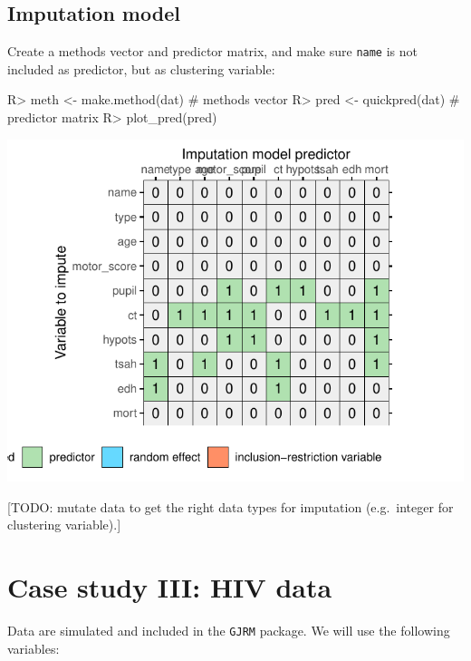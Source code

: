\documentclass[
]{jss}
\begin{document}
\hypertarget{imputation-model}{%
\subsection{Imputation model}\label{imputation-model}}

Create a methods vector and predictor matrix, and make sure
\texttt{name} is not included as predictor, but as clustering variable:

\begin{CodeChunk}
\begin{CodeInput}
R> meth <- make.method(dat) # methods vector
R> pred <- quickpred(dat)   # predictor matrix
R> plot_pred(pred)
\end{CodeInput}


\begin{center}\includegraphics{Imputation_of_Incomplete_Multilevel_Data_files/figure-latex/ignore-1} \end{center}

\end{CodeChunk}

{[}TODO: mutate data to get the right data types for imputation
(e.g.~integer for clustering variable).{]}

\hypertarget{case-study-iii-hiv-data}{%
\section{Case study III: HIV data}\label{case-study-iii-hiv-data}}

Data are simulated and included in the \texttt{GJRM} package. We will
use the following variables:
\end{document}
